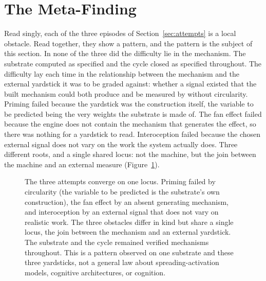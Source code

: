 \documentclass[11pt]{article}
\begin{document}
\section{The Meta-Finding}\label{sec:metafinding}

Read singly, each of the three episodes of Section~\ref{sec:attempts} is a local
obstacle. Read together, they show a pattern, and the pattern is the subject of this
section. In none of the three did the difficulty lie in the mechanism. The substrate
computed as specified and the cycle closed as specified throughout. The difficulty lay
each time in the relationship between the mechanism and the external yardstick it was to
be graded against: whether a signal existed that the built mechanism could both produce
and be measured by without circularity. Priming failed because the yardstick was the
construction itself, the variable to be predicted being the very weights the substrate is
made of. The fan effect failed because the engine does not contain the mechanism that
generates the effect, so there was nothing for a yardstick to read. Interoception failed
because the chosen external signal does not vary on the work the system actually does.
Three different roots, and a single shared locus: not the machine, but the join between
the machine and an external measure (Figure~\ref{fig:metafinding}).

\begin{figure}[t]
  \centering
  \caption{The three attempts converge on one locus. Priming failed by circularity (the
    variable to be predicted is the substrate's own construction), the fan effect by an
    absent generating mechanism, and interoception by an external signal that does not
    vary on realistic work. The three obstacles differ in kind but share a single locus,
    the join between the mechanism and an external yardstick. The substrate and the cycle
    remained verified mechanisms throughout. This is a pattern observed on one substrate
    and these three yardsticks, not a general law about spreading-activation models,
    cognitive architectures, or cognition.}
  \label{fig:metafinding}
\end{figure}
\end{document}
